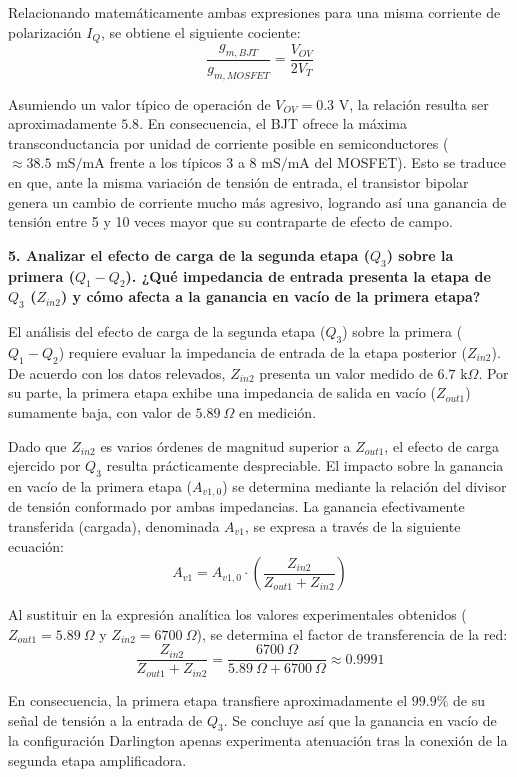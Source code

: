 Relacionando matemáticamente ambas expresiones para una misma corriente de polarización $I_Q$, se obtiene el siguiente cociente:
$$\frac{g_{m,BJT}}{g_{m,MOSFET}} = \frac{V_{OV}}{2V_T}$$

Asumiendo un valor típico de operación de $V_{OV} = 0.3\text{ V}$, la relación resulta ser aproximadamente $5.8$. En consecuencia, el BJT ofrece la máxima transconductancia por unidad de corriente posible en semiconductores ($\approx 38.5\text{ mS/mA}$ frente a los típicos $3$ a $8\text{ mS/mA}$ del MOSFET). Esto se traduce en que, ante la misma variación de tensión de entrada, el transistor bipolar genera un cambio de corriente mucho más agresivo, logrando así una ganancia de tensión entre 5 y 10 veces mayor que su contraparte de efecto de campo.

\textbf{5. Analizar el efecto de carga de la segunda etapa ($Q_3$) sobre la primera ($Q_1 - Q_2$). ¿Qué impedancia de entrada presenta la etapa de $Q_3$ ($Z_{in2}$) y cómo afecta a la ganancia en vacío de la primera etapa?}

El análisis del efecto de carga de la segunda etapa ($Q_3$) sobre la primera ($Q_1 - Q_2$) requiere evaluar la impedancia de entrada de la etapa posterior ($Z_{in2}$). De acuerdo con los datos relevados, $Z_{in2}$ presenta un valor  medido de $6.7\text{ k}\Omega$. Por su parte, la primera etapa exhibe una impedancia de salida en vacío ($Z_{out1}$) sumamente baja, con valor de $5.89\ \Omega$ en medición.

Dado que $Z_{in2}$ es varios órdenes de magnitud superior a $Z_{out1}$, el efecto de carga ejercido por $Q_3$ resulta prácticamente despreciable. El impacto sobre la ganancia en vacío de la primera etapa ($A_{v1,0}$) se determina mediante la relación del divisor de tensión conformado por ambas impedancias. La ganancia efectivamente transferida (cargada), denominada $A_{v1}$, se expresa a través de la siguiente ecuación:
$$A_{v1} = A_{v1,0} \cdot \left( \frac{Z_{in2}}{Z_{out1} + Z_{in2}} \right)$$

Al sustituir en la expresión analítica los valores experimentales obtenidos ($Z_{out1} = 5.89\ \Omega$ y $Z_{in2} = 6700\ \Omega$), se determina el factor de transferencia de la red:
$$\frac{Z_{in2}}{Z_{out1} + Z_{in2}} = \frac{6700\ \Omega}{5.89\ \Omega + 6700\ \Omega} \approx 0.9991$$

En consecuencia, la primera etapa transfiere aproximadamente el $99.9\%$ de su señal de tensión a la entrada de $Q_3$. Se concluye así que la ganancia en vacío de la configuración Darlington apenas experimenta atenuación tras la conexión de la segunda etapa amplificadora.

